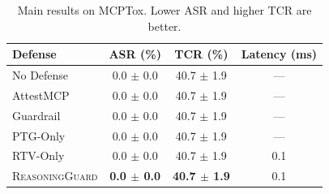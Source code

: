 \begin{table}[t]
\centering
\small
\begin{tabular}{lccc}
\toprule
Defense & ASR (\%) & TCR (\%) & Latency (ms) \\
\midrule
No Defense & 0.0 $\pm$ 0.0 & 40.7 $\pm$ 1.9 & --- \\
AttestMCP & 0.0 $\pm$ 0.0 & 40.7 $\pm$ 1.9 & --- \\
Guardrail & 0.0 $\pm$ 0.0 & 40.7 $\pm$ 1.9 & --- \\
PTG-Only & 0.0 $\pm$ 0.0 & 40.7 $\pm$ 1.9 & --- \\
RTV-Only & 0.0 $\pm$ 0.0 & 40.7 $\pm$ 1.9 & 0.1 \\
\textsc{ReasoningGuard} & \textbf{0.0 $\pm$ 0.0} & \textbf{40.7 $\pm$ 1.9} & 0.1 \\
\bottomrule
\end{tabular}
\caption{Main results on MCPTox. Lower ASR and higher TCR are better.}
\label{tab:main}
\end{table}
